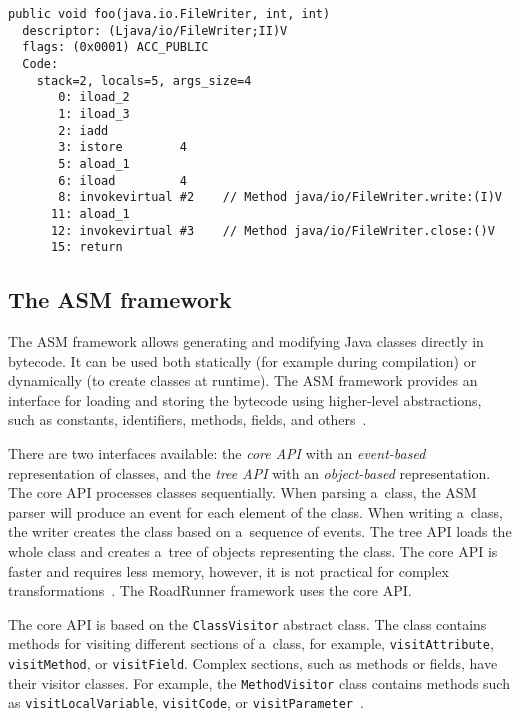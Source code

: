 \begin{lstlisting}[label=bytecodeExample, float, caption={An example of a~method
bytecode viewed using the \texttt{javap} command. The method takes three
parameters: a~file writer and two integers.  There are 5 local variables: the
object the method was called on (index 0), method parameters (indices 1--3),
and a~local variable (index 5). On lines 0--3, the two integers are loaded on
to the operand stack, added together, and the result is stored in a~local
variable. Lines 5--7 calls the \texttt{write} method on the file writer, lines
11--12 calls the \texttt{close} method. Operands on lines 8 and 12 are
indices to the constant pool section.}]
public void foo(java.io.FileWriter, int, int)
  descriptor: (Ljava/io/FileWriter;II)V
  flags: (0x0001) ACC_PUBLIC
  Code:
    stack=2, locals=5, args_size=4
       0: iload_2
       1: iload_3
       2: iadd
       3: istore        4
       5: aload_1
       6: iload         4
       8: invokevirtual #2    // Method java/io/FileWriter.write:(I)V
      11: aload_1
      12: invokevirtual #3    // Method java/io/FileWriter.close:()V
      15: return
\end{lstlisting}


\subsection{The ASM framework}

The ASM framework allows generating and modifying Java classes directly in
bytecode. It can be used both statically (for example during compilation) or
dynamically (to create classes at runtime). The ASM framework provides an
interface for loading and storing the bytecode using higher-level abstractions,
such as constants, identifiers, methods, fields, and others~\cite{asmguide}.

There are two interfaces available: the \emph{core API} with an
\emph{event-based} representation of classes, and the \emph{tree API} with an
\emph{object-based} representation. The core API processes classes sequentially.
When parsing a~class, the ASM parser will produce an event for each element of
the class.  When writing a~class, the writer creates the class based on
a~sequence of events. The tree API loads the whole class and creates a~tree of
objects representing the class. The core API is faster and requires less memory,
however, it is not practical for complex transformations~\cite{asmguide}. The
RoadRunner framework uses the core API.

The core API is based on the \texttt{ClassVisitor} abstract class. The class
contains methods for visiting different sections of a~class, for example,
\texttt{visitAttribute}, \texttt{visitMethod}, or \texttt{visitField}. Complex
sections, such as methods or fields, have their visitor classes. For example,
the \texttt{MethodVisitor} class contains methods such as
\texttt{visitLocalVariable}, \texttt{visitCode}, or
\texttt{visitParameter}~\cite{asmguide}.

